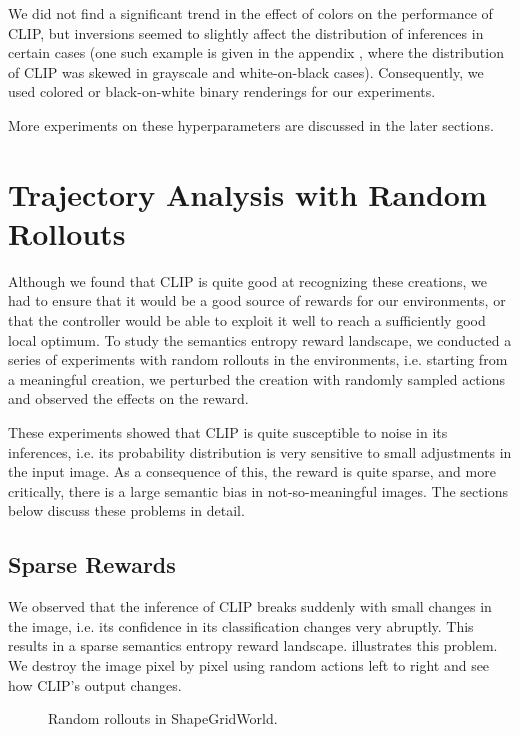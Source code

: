 We did not find a significant trend in the effect of colors on the performance of CLIP, but inversions seemed to slightly affect the distribution of inferences in certain cases
(one such example is given in the appendix , where the distribution of CLIP was skewed in grayscale and white-on-black cases).
Consequently, we used colored or black-on-white binary renderings for our experiments.

More experiments on these hyperparameters are discussed in the later sections.


\section{Trajectory Analysis with Random Rollouts}
\label{sec:clip-problems}
Although we found that CLIP is quite good at recognizing these creations, we had to ensure that it would be a good source of rewards for our environments, or that the controller would be able to exploit it well to reach a sufficiently good local optimum.
To study the semantics entropy reward landscape, we conducted a series of experiments with random rollouts in the environments, i.e. starting from a meaningful creation, we perturbed the creation with randomly sampled actions and observed the effects on the reward.

These experiments showed that CLIP is quite susceptible to noise in its inferences, i.e. its probability distribution is very sensitive to small adjustments in the input image.
As a consequence of this, the reward is quite sparse, and more critically, there is a large semantic bias in not-so-meaningful images.
The sections below discuss these problems in detail.

\subsection{Sparse Rewards} %
\label{sec:sparse-rewards}

We observed that the inference of CLIP breaks suddenly with small changes in the image, i.e. its confidence in its classification changes very abruptly.
This results in a sparse semantics entropy reward landscape.
 illustrates this problem.
We destroy the image pixel by pixel using random actions left to right and see how CLIP's output changes.

\begin{figure}[h]
    \centering
    \caption{Random rollouts in ShapeGridWorld.}
    \label{fig:sparse-rewards}
\end{figure}

